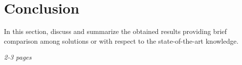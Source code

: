 \newpage
\chapter{Conclusion}
In this section, discuss and summarize the obtained results providing brief comparison among solutions or with respect to the state-of-the-art knowledge.

\textit{2-3 pages}